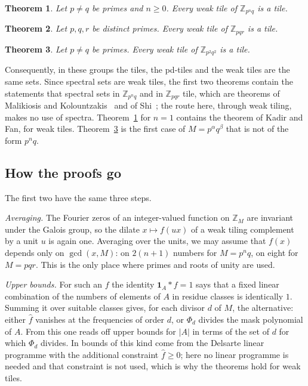 \documentclass[11pt,a4paper]{amsart}
\newtheorem{theorem}{Theorem}
\theoremstyle{definition}
\theoremstyle{remark}
\newcommand{\Z}{\mathbb{Z}}
\newcommand{\one}{\mathbf{1}}
\begin{document}
\begin{theorem}\label{thm:A}
Let $p\ne q$ be primes and $n\ge 0$. Every weak tile of $\Z_{p^nq}$ is a tile.
\end{theorem}

\begin{theorem}\label{thm:B}
Let $p,q,r$ be distinct primes. Every weak tile of $\Z_{pqr}$ is a tile.
\end{theorem}

\begin{theorem}\label{thm:C}
Let $p\ne q$ be primes. Every weak tile of $\Z_{p^2q^2}$ is a tile.
\end{theorem}

\noindent Consequently, in these groups the tiles, the pd-tiles and the weak tiles are the same sets. Since
spectral sets are weak tiles, the first two theorems contain the statements that spectral sets in $\Z_{p^nq}$ and in
$\Z_{pqr}$ tile, which are theorems of Malikiosis and Kolountzakis~\cite{MK} and of Shi~\cite{Shi}; the route
here, through weak tiling, makes no use of spectra. Theorem~\ref{thm:A} for $n=1$ contains the theorem of Kadir and Fan, for weak tiles.
Theorem~\ref{thm:C} is the first case of $M=p^\alpha q^\beta$ that is not of the form $p^nq$.

\subsection*{How the proofs go} The first two have the same three steps.

\emph{Averaging.} The Fourier zeros of an integer-valued function on $\Z_M$ are invariant under the Galois
group, so the dilate $x\mapsto f(ux)$ of a weak tiling complement by a unit $u$ is again one. Averaging over the
units, we may assume that $f(x)$ depends only on $\gcd(x,M)$: on $2(n+1)$ numbers for $M=p^nq$, on eight for
$M=pqr$. This is the only place where primes and roots of unity are used.

\emph{Upper bounds.} For such an $f$ the identity $\one_A*f=1$ says that a fixed linear combination of the
numbers of elements of $A$ in residue classes is identically $1$. Summing it over suitable classes gives, for
each divisor $d$ of $M$, the alternative: either $\hat f$ vanishes at the frequencies of order $d$, or $\Phi_d$
divides the mask polynomial of $A$. From this one reads off upper bounds for $|A|$ in terms of the set of $d$
for which $\Phi_d$ divides. In \cite{KLMS,KF} bounds of this kind come from the Delsarte linear programme with
the additional constraint $\hat f\ge 0$; here no linear programme is needed and that constraint is not used,
which is why the theorems hold for weak tiles.
\end{document}
